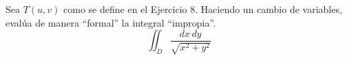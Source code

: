 Sea $T(u,v)$ como se define en el Ejercicio 8. Haciendo un cambio de variables, evalúa de manera “formal” la integral “impropia”.
\[\iint_D \frac{dx \, dy}{\sqrt{x^2 + y^2}}\]
